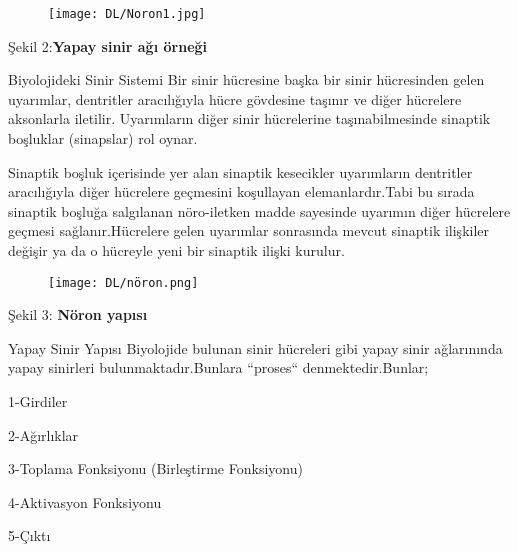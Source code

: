 \documentclass{beamer}                                                                                          %
\begin{document}
	\begin{frame}
	    \begin{figure}
	        \centering
	        \texttt{[image: DL/Noron1.jpg]}
	    \end{figure}
	    \centering
	    \color{myred1}Şekil 2:\color{black}\textbf{Yapay sinir ağı örneği}
	\end{frame}
	
	
	\begin{frame}{\centering Biyolojideki Sinir Sistemi}
        \justifying
        \color{myred1} \color{black}Bir sinir hücresine başka bir sinir hücresinden gelen uyarımlar, dentritler aracılığıyla hücre gövdesine taşınır ve diğer hücrelere aksonlarla iletilir. Uyarımların diğer sinir hücrelerine taşınabilmesinde sinaptik boşluklar (sinapslar) rol oynar.\par \vspace{25}
        \color{myred1} \color{black}Sinaptik boşluk içerisinde yer alan sinaptik kesecikler uyarımların dentritler aracılığıyla diğer hücrelere geçmesini koşullayan elemanlardır.Tabi bu sırada sinaptik boşluğa salgılanan nöro-iletken madde sayesinde uyarımın diğer hücrelere geçmesi sağlanır.Hücrelere gelen uyarımlar sonrasında mevcut sinaptik ilişkiler değişir ya da o hücreyle yeni bir sinaptik ilişki kurulur.
    \end{frame}
    
	
	\begin{frame}{}
	    \begin{figure}
	        \centering
	        \texttt{[image: DL/nöron.png]}
	    \end{figure}
	    \centering
	    \color{myred1}Şekil 3:\color{black}\textbf{ Nöron yapısı}
	\end{frame}
	

	\begin{frame}{Yapay Sinir Yapısı}
	    Biyolojide bulunan sinir hücreleri gibi yapay sinir ağlarınında yapay sinirleri bulunmaktadır.Bunlara “proses“ denmektedir.Bunlar;\newline
	        
        	     \color{myred1}1-\color{black}Girdiler\par \vspace{5}
        	     \color{myred1}2-\color{black}Ağırlıklar\par \vspace{5}
        	     \color{myred1}3-\color{black}Toplama Fonksiyonu (Birleştirme Fonksiyonu)\par \vspace{5}
        	     \color{myred1}4-\color{black}Aktivasyon Fonksiyonu\par \vspace{5}
        	     \color{myred1}5-\color{black}Çıktı
    \end{frame}
    
\end{document}
